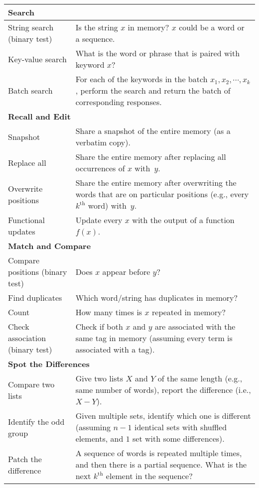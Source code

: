 \begin{table*}[t!]
\centering
\begin{tabular}{|p{5cm}|p{10cm}|}
%
\multicolumn{2}{l}{\textbf{Search}} \\ \hline
String search (binary test) & Is the string $x$ in memory? $x$ could be a word or a sequence.\\ \hline
Key-value search & What is the word or phrase that is paired with keyword $x$?\\ \hline
Batch search & For each of the keywords in the batch $x_1, x_2, \cdots, x_k$, perform the search and return the batch of corresponding responses.   \\ \hline
%
\multicolumn{2}{l}{\textbf{Recall and Edit}}    \\ \hline
Snapshot & Share a snapshot of the entire memory (as a verbatim copy). \\ \hline
Replace all & Share the entire memory after replacing all occurrences of $x$ with~$y$. \\ \hline
Overwrite positions & Share the entire memory after overwriting the words that are on particular positions (e.g., every $k^{\text{th}}$ word) with~$y$. \\ \hline
Functional updates & Update every $x$ with the output of a function $f(x)$.\\ \hline
%
\multicolumn{2}{l}{\textbf{Match and Compare}}    \\ \hline
Compare positions (binary test) & Does $x$ appear before $y$? \\ \hline
Find duplicates & Which word/string has duplicates in memory? \\ \hline
Count & How many times is $x$ repeated in memory? \\ \hline
Check association (binary test) & Check if both $x$ and $y$ are associated with the same tag in memory (assuming every term is associated with a tag).\\ \hline
%
\multicolumn{2}{l}{\textbf{Spot the Differences}}    \\ \hline
Compare two lists & Give two lists $X$ and $Y$ of the same length (e.g., same number of words), report the difference (i.e., $X - Y$). \\ \hline
Identify the odd group & Given multiple sets, identify which one is different (assuming $n-1$ identical sets with shuffled elements, and $1$ set with some differences). \\ \hline
Patch the difference & A sequence of words is repeated multiple times, and then there is a partial sequence. What is the next $k^{\text{th}}$ element in the sequence? \\ \hline

\end{tabular}
\end{table*}
